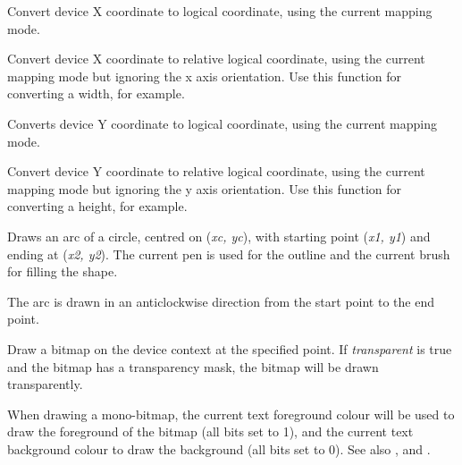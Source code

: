 Convert device X coordinate to logical coordinate, using the current
mapping mode.

\label{wxsvgfiledcdevicetologicalxrel}


Convert device X coordinate to relative logical coordinate, using the current
mapping mode but ignoring the x axis orientation.
Use this function for converting a width, for example.

\label{wxsvgfiledcdevicetologicaly}


Converts device Y coordinate to logical coordinate, using the current
mapping mode.

\label{wxsvgfiledcdevicetologicalyrel}


Convert device Y coordinate to relative logical coordinate, using the current
mapping mode but ignoring the y axis orientation.
Use this function for converting a height, for example.

\label{wxsvgfiledcdrawarc}


Draws an arc of a circle, centred on ({\it xc, yc}), with starting point ({\it x1, y1})
and ending at ({\it x2, y2}).   The current pen is used for the outline
and the current brush for filling the shape.

The arc is drawn in an anticlockwise direction from the start point to the end point.

\label{wxsvgfiledcdrawbitmap}


Draw a bitmap on the device context at the specified point. If {\it transparent} is true and the bitmap has
a transparency mask, the bitmap will be drawn transparently.

When drawing a mono-bitmap, the current text foreground colour will be used to draw the foreground
of the bitmap (all bits set to 1), and the current text background colour to draw the background
(all bits set to 0). See also , 
 and .

